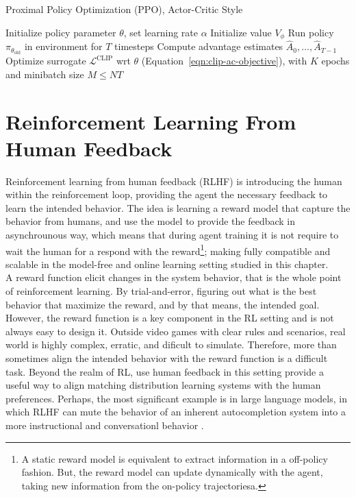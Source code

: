 \begin{algorithm}
    \caption{Proximal Policy Optimization (PPO), Actor-Critic Style}
    \begin{algorithmic}
    \STATE Initialize policy parameter $\theta$, set learning rate $\alpha$
    \STATE Initialize value $V_{\phi}$
            \STATE Run policy $\pi_{\theta_{\text{old}}}$ in environment for $T$ timesteps        
            \STATE Compute advantage estimates $\hat{A}_{0}, \dots, \hat{A}_{T-1}$
        \ENDFOR
        \STATE Optimize surrogate $\mathcal{L}^{\text{CLIP}}$ wrt $\theta$ (Equation~\ref{eqn:clip-ac-objective}), with $K$ epochs and minibatch size $M\leq NT$
    \ENDFOR
    \end{algorithmic}
\end{algorithm}


\section{Reinforcement Learning From Human Feedback}\label{sec:rlhf}

Reinforcement learning from human feedback (RLHF) is introducing the human within the reinforcement loop, providing the agent the necessary feedback to learn the intended behavior. The idea is learning a reward model that capture the behavior from humans, and use the model to provide the feedback in asynchrounous way, which means that during agent training it is not require to wait the human for a respond with the reward\footnote{A static reward model is equivalent to extract information in a off-policy fashion. But, the reward model can update dynamically with the agent, taking new information from the on-policy trajectoriesa.}; making fully compatible and scalable in the model-free and online learning setting studied in this chapter. \\

\noindent A reward function elicit changes in the system behavior, that is the whole point of reinforcement learning. By trial-and-error, figuring out what is the best behavior that maximize the reward, and by that means, the intended goal. However, the reward function is a key component in the RL setting and is not always easy to design it. Outside video games with clear rules and scenarios, real world is highly complex, erratic, and dificult to simulate. Therefore, more than sometimes align the intended behavior with the reward function is a difficult task. Beyond the realm of RL, use human feedback in this setting provide a useful way to align matching distribution learning systems with the human preferences. Perhaps, the most significant example is in large language models, in which RLHF can mute the behavior of an inherent autocompletion system into a more instructional and conversationl behavior \cite{ouyang2022training}.

